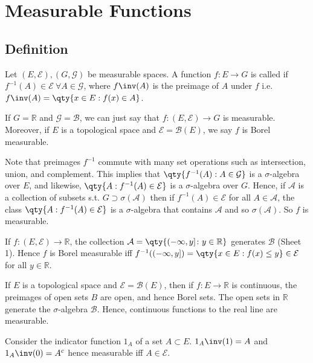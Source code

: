 \section{Measurable Functions}
\subsection{Definition}
\begin{definition}[Measurable]
	Let $(E, \mathcal E), (G, \mathcal G)$ be measurable spaces.
	A function $f \colon E \to G$ is called  if $f^{-1}(A) \in \mathcal E \ \forall A \in \mathcal{G}$, where $f\inv(A)$ is the preimage of $A$ under $f$ i.e. $f\inv(A) = \qty{x \in E : f(x) \in A}$.
\end{definition}

If $G = \mathbb R$ and $\mathcal G = \mathcal B$, we can just say that $f \colon (E, \mathcal E) \to G$ is measurable.
Moreover, if $E$ is a topological space and $\mathcal E = \mathcal B(E)$, we say $f$ is Borel measurable.

Note that preimages $f^{-1}$ commute with many set operations such as intersection, union, and complement.
This implies that $\qty{f^{-1}(A) : A \in \mathcal G}$ is a $\sigma$-algebra over $E$, and likewise, $\qty{A : f^{-1}(A) \in \mathcal E}$ is a $\sigma$-algebra over $G$.
Hence, if $\mathcal A$ is a collection of subsets s.t. $G \supset \sigma(\mathcal{A})$ then if $f^{-1}(A) \in \mathcal E$ for all $A \in \mathcal A$, the class $\qty{A : f^{-1}(A) \in \mathcal E}$ is a $\sigma$-algebra that contains $\mathcal A$ and so $\sigma(\mathcal{A})$.
So $f$ is measurable.

If $f \colon (E, \mathcal E) \to \mathbb R$, the collection $\mathcal A = \qty{(-\infty,y] \colon y \in \mathbb R}$ generates $\mathcal B$ (Sheet 1).
Hence $f$ is Borel measurable iff $f^{-1}((-\infty,y]) = \qty{x \in E : f(x) \leq y} \in \mathcal E$ for all $y \in \mathbb R$.

If $E$ is a topological space and $\mathcal E = \mathcal B(E)$, then if $f \colon E \to \mathbb R$ is continuous, the preimages of open sets $B$ are open, and hence Borel sets.
The open sets in $\mathbb R$ generate the $\sigma$-algebra $\mathcal B$.
Hence, continuous functions to the real line are measurable.

\begin{example}
	Consider the indicator function $1_A$ of a set $A \subset E$. $1_A\inv(1) = A$ and $1_A\inv(0) = A^c$ hence measurable iff $A \in \mathcal E$.
\end{example}


